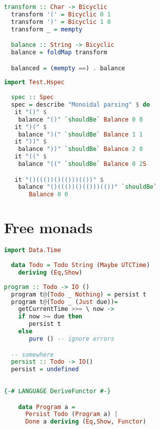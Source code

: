 \documentclass[10pt]{beamer}
\begin{document}
\begin{frame}[fragile]
  \begin{lstlisting}[language=haskell]
  transform :: Char -> Bicyclic
  transform '(' = Bicyclic 0 1
  transform ')' = Bicyclic 1 0
  transform _ = mempty

  balance :: String -> Bicyclic
  balance = foldMap transform

  balanced = (mempty ==) . balance
  \end{lstlisting}
\end{frame}
\begin{frame}[fragile]
  \begin{lstlisting}[language=haskell]
  import Test.Hspec
  
  spec :: Spec
  spec = describe "Monoidal parsing" $ do
   it "()" $
    balance "()" `shouldBe` Balance 0 0
   it ")(" $
    balance ")(" `shouldBe` Balance 1 1
   it "))" $
    balance "))" `shouldBe` Balance 2 0
   it "((" $
    balance "((" `shouldBe` Balance 0 2S

   it "()((())()(()))(())" $
    balance "()((())()(()))(())" `shouldBe` 
       Balance 0 0
  \end{lstlisting}
\end{frame}

\section{Free monads}
\begin{frame}[fragile]
  \begin{lstlisting}[language=haskell]
  import Data.Time
  
  data Todo = Todo String (Maybe UTCTime) 
    deriving (Eq,Show) 
  \end{lstlisting}
\end{frame}

\begin{frame}[fragile]
  \begin{lstlisting}[language=haskell]
  program :: Todo -> IO ()
  program t@(Todo _ Nothing) = persist t
  program t@(Todo _ (Just due))=
    getCurrentTime >>= \ now ->
    if now >= due then
       persist t
    else
       pure () -- ignore errors  

  -- somewhere 
  persist :: Todo -> IO()
  persist = undefined
       
  \end{lstlisting}
\end{frame}

\begin{frame}[fragile]
  \begin{lstlisting}[language=haskell]
   {-# LANGUAGE DeriveFunctor #-}

    data Program a =
      Persist Todo (Program a) |
      Done a deriving (Eq,Show, Functor)
  \end{lstlisting}
\end{frame}
\end{document}
